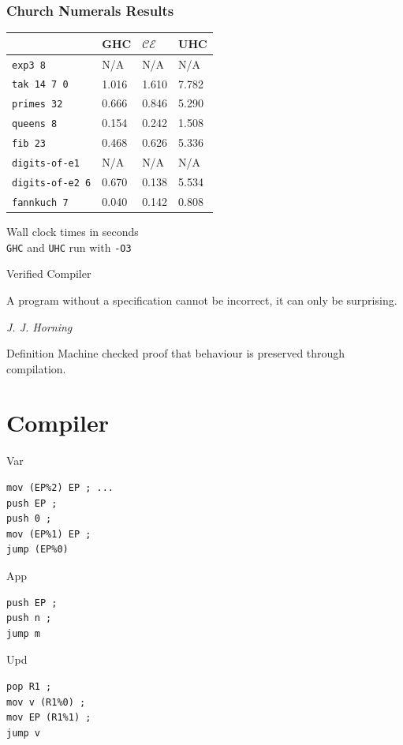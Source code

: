 \documentclass[14pt,mathserif]{beamer}
\newcommand{\sectionslide}[3]{
  \begin{frame}
  \vspace{1cm}
  \vfill
  {\usebeamerfont{title} \color{red} #1}
  \vfill
  \epigraph{\footnotesize{#2}}{\footnotesize{\emph{#3}}}
  \end{frame}}
\begin{document}
\begin{frame}[fragile]
\frametitle{Church Numerals Results}
\centering
\small
\begin{tabularx}{\textwidth}{l | X | g | X}
& GHC & $\mathcal{CE}$ & UHC \\
\hline
\texttt{exp3 8} & N/A & N/A & N/A \\
\texttt{tak 14 7 0} & 1.016 & 1.610 & 7.782 \\
\texttt{primes 32} & 0.666 & 0.846 & 5.290 \\
\texttt{queens 8} & 0.154 & 0.242 & 1.508 \\
\texttt{fib 23} &  0.468 & 0.626 & 5.336 \\
\texttt{digits-of-e1 } & N/A & N/A & N/A \\
\texttt{digits-of-e2 6} & 0.670 & 0.138 & 5.534 \\
\texttt{fannkuch 7} & 0.040 & 0.142 & 0.808
\end{tabularx}
\begin{center}
Wall clock times in seconds \\
\texttt{GHC} and \texttt{UHC} run with \texttt{-O3}
\end{center}
\end{frame}

\sectionslide{Verified Compiler}
{A program without a specification cannot be incorrect, it can only be
surprising.}
{J. J. Horning}

\begin{frame}{Definition}
Machine checked proof that behaviour is preserved through compilation.
\end{frame}

\section{Compiler}

\begin{frame}[fragile]{Var}
\begin{lstlisting}
mov (EP%2) EP ; ... 
push EP ;
push 0 ;
mov (EP%1) EP ;
jump (EP%0)
\end{lstlisting}
\end{frame}

\begin{frame}[fragile]{App}
\begin{lstlisting}
push EP ;
push n ;
jump m 
\end{lstlisting}
\end{frame}

\begin{frame}[fragile]{Upd}
\begin{lstlisting}
pop R1 ;
mov v (R1%0) ;
mov EP (R1%1) ;
jump v 
\end{lstlisting}
\end{frame}
\end{document}
